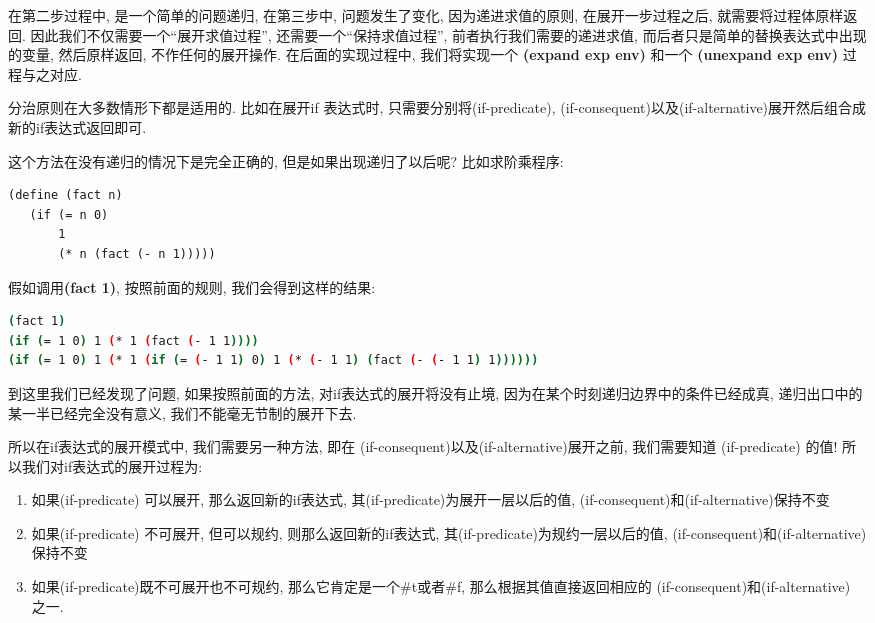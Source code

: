 \documentclass{article}
\begin{document}
\begin{CJK*}{UTF8}{gkai}
在第二步过程中, 是一个简单的问题递归, 在第三步中, 问题发生了变化, 因为递进求值的原则, 在展开一步过程之后, 就需要将过程体原样返回. 因此我们不仅需要一个``展开求值过程'', 还需要一个``保持求值过程'', 前者执行我们需要的递进求值, 而后者只是简单的替换表达式中出现的变量, 然后原样返回, 不作任何的展开操作. 在后面的实现过程中, 我们将实现一个 {\bfseries \ttfamily (expand exp env)} 和一个 {\bfseries \ttfamily (unexpand exp env)} 过程与之对应.

\vspace{2em}

分治原则在大多数情形下都是适用的. 比如在展开if 表达式时, 只需要分别将(if-predicate), (if-consequent)以及(if-alternative)展开然后组合成新的if表达式返回即可. 

这个方法在没有递归的情况下是完全正确的, 但是如果出现递归了以后呢? 比如求阶乘程序:

\begin{lstlisting}
(define (fact n)
   (if (= n 0)
       1
       (* n (fact (- n 1)))))
\end{lstlisting}

假如调用{\ttfamily \bfseries (fact 1)}, 按照前面的规则, 我们会得到这样的结果:

\begin{lstlisting}[language=bash, numbers=none, basicstyle=\footnotesize\color{green}\ttfamily\bfseries, backgroundcolor=\color{black}]
(fact 1)
(if (= 1 0) 1 (* 1 (fact (- 1 1))))
(if (= 1 0) 1 (* 1 (if (= (- 1 1) 0) 1 (* (- 1 1) (fact (- (- 1 1) 1))))))
\end{lstlisting}

到这里我们已经发现了问题, 如果按照前面的方法, 对if表达式的展开将没有止境, 因为在某个时刻递归边界中的条件已经成真, 递归出口中的某一半已经完全没有意义, 我们不能毫无节制的展开下去.

所以在if表达式的展开模式中, 我们需要另一种方法, 即在 (if-consequent)以及(if-alternative)展开之前, 我们需要知道 (if-predicate) 的值! 所以我们对if表达式的展开过程为:

\begin{enumerate}
    \item 如果(if-predicate) {\color{red}可以展开}, 那么返回新的if表达式, 其(if-predicate)为展开一层以后的值, (if-consequent)和(if-alternative)保持不变
    \item 如果(if-predicate) 不可展开, 但{\color{red}可以规约}, 则那么返回新的if表达式, 其(if-predicate)为规约一层以后的值, (if-consequent)和(if-alternative)保持不变
    \item 如果(if-predicate)既不可展开也不可规约, 那么它肯定是一个\#t或者\#f, 那么根据其值直接返回相应的 (if-consequent)和(if-alternative) 之一.
\end{enumerate}


\end{CJK*}
\end{document}
